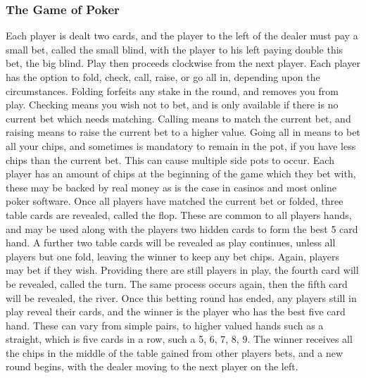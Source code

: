 \subsubsection{The Game of Poker}
Each player is dealt two cards, and the player to the left of the dealer must
pay a small bet, called the small blind, with the player to his left paying 
double this bet, the big blind. Play then proceeds clockwise from the next
player. Each player has the option to fold, check, call, raise, or go all in,
depending upon the circumstances. Folding forfeits any stake in the round, and
removes you from play. Checking means you wish not to bet, and is only
available if there is no current bet which needs matching. Calling means to
match the current bet, and raising means to raise the current bet to a higher
value. Going all in means to bet all your chips, and sometimes is mandatory to
remain in the pot, if you have less chips than the current bet. This can cause
multiple side pots to occur. Each player has an amount of chips at the 
beginning of the game which they bet with, these may be backed by real money as
is the case in casinos and most online poker software. Once all players have
matched the current bet or folded, three table cards are revealed, called
the flop. These are common to all players hands, and may be used along with
the players two hidden cards to form the best 5 card hand. A further two table
cards will be revealed as play continues, unless all players but one fold,
leaving the winner to keep any bet chips. Again, players may bet if they wish.
Providing there are still players in play, the fourth card will be revealed, 
called the turn. The same process occurs again, then the fifth card will be
revealed, the river. Once this betting round has ended, any players still
in play reveal their cards, and the winner is the player who has the best
five card hand. These can vary from simple pairs, to higher valued hands such
as a straight, which is five cards in a row, such a 5, 6, 7, 8, 9. The winner
receives all the chips in the middle of the table gained from other players
bets, and a new round begins, with the dealer moving to the next player on the
left.
